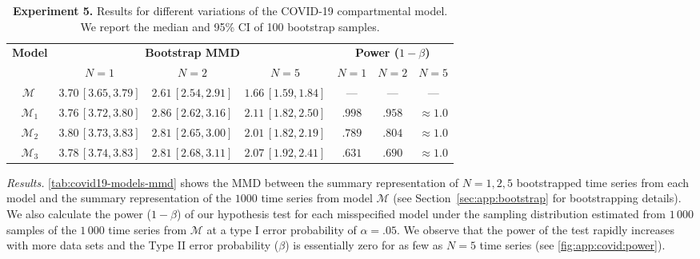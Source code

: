 \documentclass[twoside,11pt]{article}
\newcommand{\numberCovid}{5}
\newcommand{\0}{\boldsymbol{0}}
\begin{document}
\begin{table}[b]
    \centering
    \renewcommand{\arraystretch}{1.2}
    \begin{tabular}{c|ccc|ccc}
        \multirow{2}{*}{\bfseries Model}& 
        \multicolumn{3}{c|}{\bfseries Bootstrap MMD} & 
        \multicolumn{3}{c}{ \bfseries Power ($1-\beta$)} \\
        & $N=1$  & $N=2$ & $N=5$ & $N=1$ & $N=2$ & $N=5$\\
        \hline
        $\mathcal{M}_{\ }$ & $3.70\,[3.65, 3.79]$ & $2.61\,[2.54, 2.91]$ & $1.66\,[1.59, 1.84]$ & --- & --- & ---\\
        $\mathcal{M}_1$ & $3.76\,[3.72, 3.80]$ & $2.86\,[2.62, 3.16]$ & $2.11\,[1.82, 2.50]$ & $.998$ & $.958$ & $\approx1.0$ \\
        $\mathcal{M}_2$ & $3.80\,[3.73, 3.83]$ & $2.81\,[2.65, 3.00]$ & $2.01\,[1.82, 2.19]$ & $.789$ & $.804$ & $\approx1.0$ \\
        $\mathcal{M}_3$ & $3.78\,[3.74, 3.83]$ & $2.81\,[2.68, 3.11]$ & $2.07\,[1.92, 2.41]$ & $.631$ & $.690$ & $\approx1.0$ \\
    \end{tabular}
    \caption{
    \textbf{Experiment \numberCovid.} Results for different variations of the COVID-19 compartmental model.
    We report the median and 95\% CI of 100 bootstrap samples. 
    }
    \label{tab:covid19-models-mmd}
\end{table}
\textit{Results.}
\autoref{tab:covid19-models-mmd} shows the MMD between the summary representation of $N=1,2,5$ bootstrapped time series from each model and the summary representation of the $1000$ time series from model $\mathcal{M}$ (see Section~\ref{sec:app:bootstrap} for bootstrapping details).
We also calculate the power ($1-\beta$) of our hypothesis test for each misspecified model under the sampling distribution estimated from $1\,000$ samples of the $1\,000$ time series from $\mathcal{M}$ at a type I error probability of $\alpha=.05$.
We observe that the power of the test rapidly increases with more data sets and the Type II error probability ($\beta$) is essentially zero for as few as $N=5$ time series (see \autoref{fig:app:covid:power}).
\end{document}
